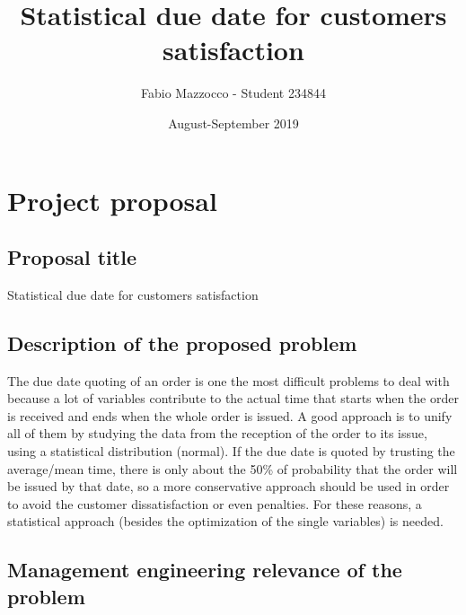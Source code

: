 \documentclass[a4paper,12pt]{article}
\begin{document}


\title{Statistical due date for customers satisfaction }
\author{Fabio Mazzocco - Student  234844}
\date{August-September 2019}
\maketitle

\tableofcontents

\section{Project proposal} 
\subsection{Proposal title}
Statistical due date for customers satisfaction

\subsection{Description of the proposed problem}

The due date quoting of an order is one the most difficult problems to deal with because a lot of variables contribute to the actual time that starts when the order is received and ends when the whole order is issued. A good approach is to unify all of them by studying the data from the reception of the order to its issue, using a statistical distribution (normal). If the due date is quoted by trusting the average/mean time, there is only about the 50\% of probability that the order will be issued by that date, so a more conservative approach should be used in order to avoid the customer dissatisfaction or even penalties. For these reasons, a statistical approach (besides the optimization of the single variables) is needed.

\subsection{Management engineering relevance of the problem}
\end{document}
